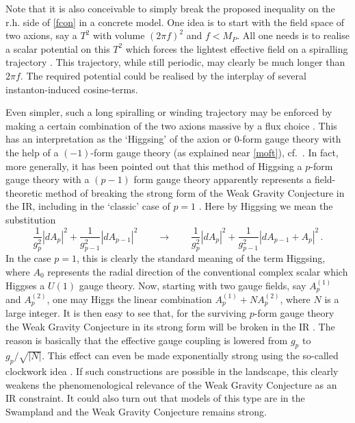 \documentclass[12pt]{article}
\newcommand{\be}{\begin{equation}}
\newcommand{\ee}{\end{equation}}
\numberwithin{equation}{section}
\begin{document}
Note that it is also conceivable to simply break the proposed inequality on the r.h. side of \eqref{fcon} in a concrete model. One idea is to start with the field space of two axions, say a $T^2$ with volume $(2\pi f)^2$ and $f<M_P$. All one needs is to realise a scalar potential on this $T^2$ which forces the lightest effective field on a spiralling trajectory \cite{Kim:2004rp}. This trajectory, while still periodic, may clearly be much longer than $2\pi f$. The required potential could be realised by the interplay of several instanton-induced cosine-terms. 

Even simpler, such a long spiralling or winding trajectory may be enforced by making a certain combination of the two axions massive by a flux choice \cite{Hebecker:2015rya}. This has an interpretation as the `Higgsing' of the axion or $0$-form gauge theory with the help of a $(-1)$-form gauge theory (as explained near \eqref{moft}), cf.~\cite{Dvali:2005an}. In fact, more generally, it has been pointed out that this method of Higgsing a $p$-form gauge theory with a $(p-1)$ form gauge theory apparently represents a field-theoretic method of breaking the strong form of the Weak Gravity Conjecture in the IR, including in the `classic' case of $p=1$ \cite{Saraswat:2016eaz}. Here by Higgsing we mean the substitution
\be
\frac{1}{g_p^2}|dA_p|^2+\frac{1}{g_{p-1}^2}|dA_{p-1}|^2\qquad \to\qquad 
\frac{1}{g_p^2}|dA_p|^2+\frac{1}{g_{p-1}^2}|dA_{p-1}+A_p|^2\,.
\ee
In the case $p=1$, this is clearly the standard meaning of the term Higgsing, where $A_0$ represents the radial direction of the conventional complex scalar which Higgses a $U(1)$ gauge theory. Now, starting with two gauge fields, say $A_p^{(1)}$ and $A_p^{(2)}$, one may Higgs the linear combination $A_p^{(1)}+N A_p^{(2)}$, where $N$ is a large integer. It is then easy to see that, for the surviving $p$-form gauge theory the Weak Gravity Conjecture in its strong form  will be broken in the IR \cite{Hebecker:2015rya, Saraswat:2016eaz}. The reason is basically that the effective gauge coupling is lowered from $g_p$ to $g_p/\sqrt{|N|}$. This effect can even be made exponentially strong using the so-called clockwork idea \cite{Kaplan:2015fuy, Choi:2015fiu}. If such constructions are possible in the landscape, this clearly weakens the phenomenological relevance of the Weak Gravity Conjecture as an IR constraint. It could also turn out that models of this type are in the Swampland and the Weak Gravity Conjecture remains strong.
\end{document}
